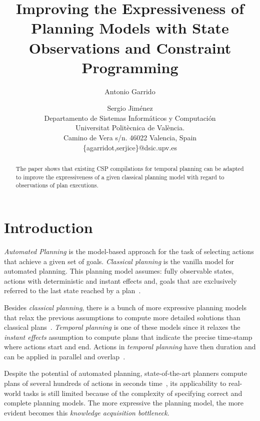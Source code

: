 \documentclass[letterpaper]{article} %
\begin{document}
\title{Improving the Expressiveness of Planning Models with State Observations and Constraint Programming}

\author{Antonio Garrido\and Sergio Jim\'enez\\
{\small Departamento de Sistemas Inform\'aticos y Computaci\'on}\\
{\small Universitat Polit\`ecnica de Val\`encia.}\\
{\small Camino de Vera s/n. 46022 Valencia, Spain}\\
{\small \{agarridot,serjice\}@dsic.upv.es}}



\maketitle
\begin{abstract}
The paper shows that existing CSP compilations for temporal planning can be adapted to improve the expressiveness of a given classical planning model with regard to observations of plan executions.
\end{abstract}


\section{Introduction}
\label{sec:introduction}
{\em Automated Planning} is the model-based approach for the task of selecting actions that achieve a given set of goals. {\em Classical planning} is the vanilla model for automated planning. This planning model assumes: fully observable states, actions with deterministic and instant effects and, goals that are exclusively referred to the last state reached by a plan~\cite{geffner2013concise}.

Besides {\em classical planning}, there is a bunch of more expressive planning models that relax the previous assumptions to compute more detailed solutions than classical plans~\cite{ghallab2004automated}. {\em Temporal planning} is one of these models since it relaxes the {\em instant effects} assumption to compute plans that indicate the precise time-stamp where actions start and end. Actions in {\em temporal planning} have then duration and can be applied in parallel and overlap~\cite{cushing2007temporal}.

Despite the potential of automated planning, state-of-the-art planners compute plans of several hundreds of actions in seconds time~\cite{vallati20152014}, its applicability to real-world tasks is still limited because of the complexity of specifying correct and complete planning models. The more expressive the planning model, the more evident becomes this {\em knowledge acquisition bottleneck}.
\end{document}
